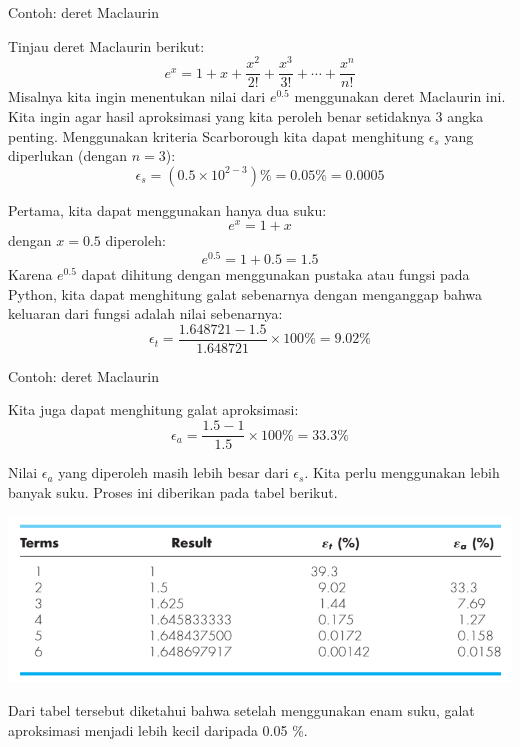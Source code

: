 \begin{frame}[fragile]{Contoh: deret Maclaurin}
\fontsize{9}{10}\selectfont

Tinjau deret Maclaurin berikut:
\begin{equation*}
e^{x} = 1 + x + \frac{x^2}{2!} + \frac{x^3}{3!} + \cdots + \frac{x^{n}}{n!}
\end{equation*}
Misalnya kita ingin menentukan nilai dari $e^{0.5}$ menggunakan deret Maclaurin ini.
Kita ingin agar hasil aproksimasi yang kita peroleh benar setidaknya 3 angka penting.
Menggunakan kriteria Scarborough kita dapat menghitung $\epsilon_s$ yang
diperlukan (dengan $n=3$):
\begin{equation*}
\epsilon_{s} = (0.5 \times 10^{2-3})\% = 0.05\% = 0.0005
\end{equation*}

Pertama, kita dapat menggunakan hanya dua suku:
$$
e^{x} = 1 + x
$$
dengan $x = 0.5$ diperoleh:
$$
e^{0.5} = 1 + 0.5 = 1.5
$$
Karena $e^{0.5}$ dapat dihitung dengan menggunakan pustaka atau fungsi 
pada Python, kita dapat menghitung galat sebenarnya dengan menganggap bahwa keluaran
dari fungsi  adalah nilai sebenarnya:
$$
\epsilon_{t} = \frac{1.648721 - 1.5}{1.648721} \times 100\% = 9.02\%
$$
\end{frame}


\begin{frame}[fragile]{Contoh: deret Maclaurin}
\fontsize{9}{10}\selectfont

Kita juga dapat menghitung galat aproksimasi:
$$
\epsilon_{a} = \frac{1.5 - 1}{1.5} \times 100\% = 33.3 \% 
$$

Nilai $\epsilon_a$ yang diperoleh masih lebih besar dari $\epsilon_s$. Kita
perlu menggunakan lebih banyak suku. Proses ini diberikan pada tabel berikut.

{\centering
\includegraphics[height=0.4\textheight]{../chapra_7th/Chapra_Table_Example_3_2.png}
\par}

Dari tabel tersebut diketahui bahwa setelah menggunakan enam suku, galat aproksimasi
menjadi lebih kecil daripada 0.05 \%.


\end{frame}



